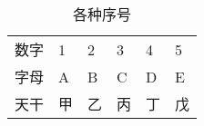 \begin{longtabu}to 0.5\textwidth{|c|X|X|X|X|X|}
\hline
\endhead
\hline
\endfoot
\caption{各种序号} \\ \hline
\endfirsthead
  数字 & 1 & 2 & 3 & 4 & 5 \\ \hline
  字母 & A & B & C & D & E \\ \hline
  天干 & 甲 & 乙 & 丙 & 丁 & 戊 \\
\end{longtabu}
